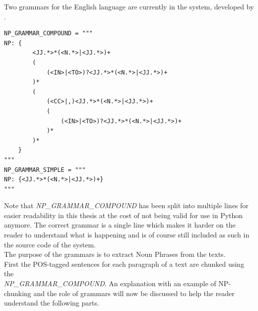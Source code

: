Two grammars for the English language are currently in the system, developed by \cite{novavcek2014skimmr}.
\begin{lstlisting}[frame=single, caption={Noun Phrase grammars}, label=npgrammar]
NP_GRAMMAR_COMPOUND = """
NP: {
        <JJ.*>*(<N.*>|<JJ.*>)+
        (
            (<IN>|<TO>)?<JJ.*>*(<N.*>|<JJ.*>)+
        )*
        (
            (<CC>|,)<JJ.*>*(<N.*>|<JJ.*>)+
            (
                (<IN>|<TO>)?<JJ.*>*(<N.*>|<JJ.*>)+
            )*
        )*
    }
"""
NP_GRAMMAR_SIMPLE = """
NP: {<JJ.*>*(<N.*>|<JJ.*>)+}
"""
\end{lstlisting}
Note that \textit{NP\_GRAMMAR\_COMPOUND} has been split into multiple lines for easier readability in this thesis at the cost of not being valid for use in Python anymore. The correct grammar is a single line which makes it harder on the reader to understand what is happening and is of course still included as such in the source code of the system.\\
The purpose of the grammars is to extract Noun Phrases from the texts.\\
First the POS-tagged sentences for each paragraph of a text are chunked using the \\
\textit{NP\_GRAMMAR\_COMPOUND}. An explanation with an example of NP-chunking and the role of grammars will now be discussed to help the reader understand the following parts.
